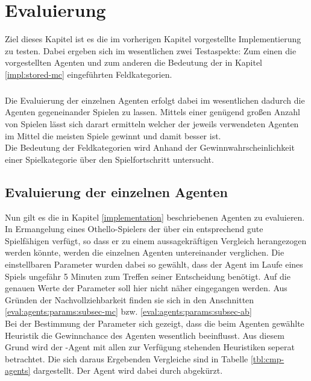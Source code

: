 \chapter{Evaluierung}
Ziel dieses Kapitel ist es die im vorherigen Kapitel vorgestellte Implementierung zu testen. Dabei ergeben sich im wesentlichen zwei Testaspekte: Zum einen die vorgestellten Agenten und zum anderen die Bedeutung der in Kapitel \ref{impl:stored-mc} eingeführten Feldkategorien.
\paragraph{}
Die Evaluierung der einzelnen Agenten erfolgt dabei im wesentlichen dadurch die Agenten gegeneinander Spielen zu lassen. Mittels einer genügend großen Anzahl von Spielen lässt sich darart ermitteln welcher der jeweils verwendeten Agenten im Mittel die meisten Spiele gewinnt und damit besser ist.
\\Die Bedeutung der Feldkategorien wird Anhand der Gewinnwahrscheinlichkeit einer Spielkategorie über den Spielfortschritt untersucht.
\section{Evaluierung der einzelnen Agenten}
Nun gilt es die in Kapitel \ref{implementation} beschriebenen Agenten zu evaluieren. In Ermangelung eines Othello-Spielers der über ein entsprechend gute Spielfähigen verfügt, so dass er zu einem aussagekräftigen Vergleich herangezogen werden könnte, werden die einzelnen Agenten untereinander verglichen. Die einstellbaren Parameter wurden dabei so gewählt, dass der Agent im Laufe eines Spiels ungefähr 5 Minuten zum Treffen seiner Entscheidung benötigt. Auf die genauen Werte der Parameter soll hier nicht näher eingegangen werden. Aus Gründen der Nachvollziehbarkeit finden sie sich in den Anschnitten \ref{eval:agents:params:subsec-mc} bzw. \ref{eval:agents:params:subsec-ab}
\\Bei der Bestimmung der Parameter sich gezeigt, dass die beim Agenten  gewählte Heuristik die Gewinnchance des Agenten wesentlich beeinflusst. Aus diesem Grund wird der -Agent mit allen zur Verfügung stehenden Heuristiken seperat betrachtet. Die sich daraus Ergebenden Vergleiche sind in Tabelle \ref{tbl:cmp-agents} dargestellt. Der Agent  wird dabei durch  abgekürzt.
